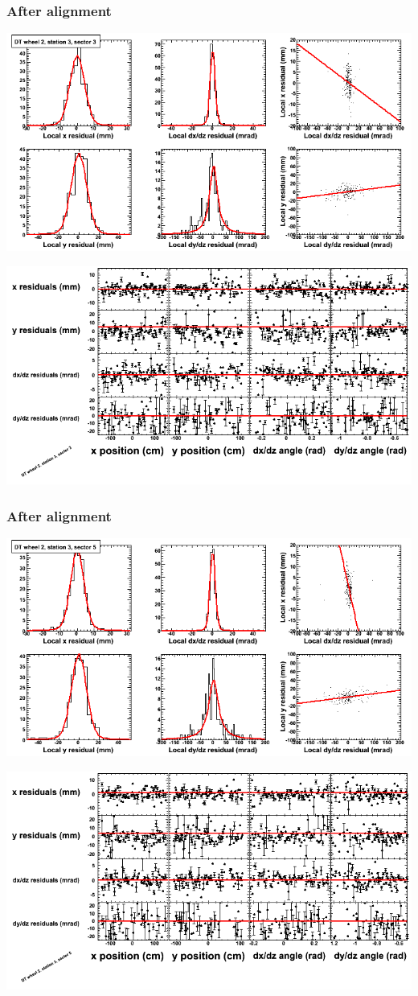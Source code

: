 \documentclass[compress]{beamer}
\begin{document}
\begin{frame}
\frametitle{After alignment}
\includegraphics[width=0.7\linewidth]{NOV4_fitfunctions/MBwhEst3sec03_bellcurves.png}

\includegraphics[width=0.7\linewidth]{NOV4_fitfunctions/MBwhEst3sec03_polynomials.png}
\end{frame}

\begin{frame}
\frametitle{After alignment}
\includegraphics[width=0.7\linewidth]{NOV4_fitfunctions/MBwhEst3sec05_bellcurves.png}

\includegraphics[width=0.7\linewidth]{NOV4_fitfunctions/MBwhEst3sec05_polynomials.png}
\end{frame}
\end{document}
